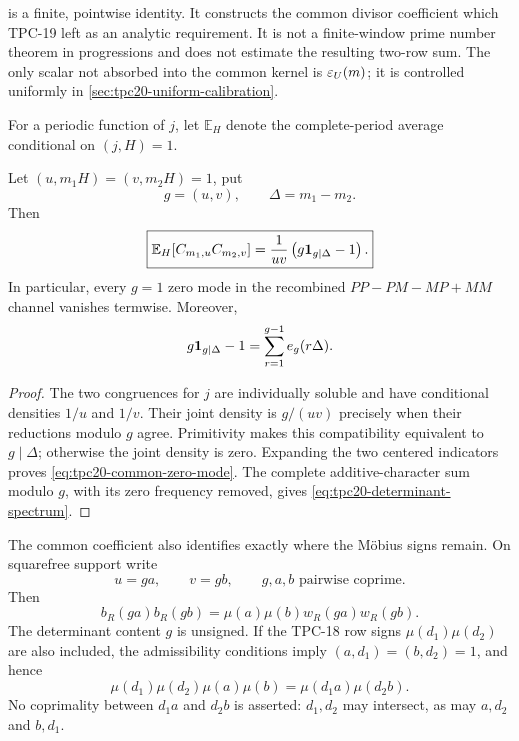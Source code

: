 \begin{remark}
\label{rem:tpc20-recombination-scope}
 is a finite, pointwise identity.
It constructs the common divisor coefficient which TPC-19 left as an
analytic requirement.  It is not a finite-window prime number theorem
in progressions and does not estimate the resulting two-row sum.  The
only scalar not absorbed into the common kernel is
\(\varepsilon_U(m)\); it is controlled uniformly in
\cref{sec:tpc20-uniform-calibration}.
\end{remark}

For a periodic function of \(j\), let \(\mathbb E_H\) denote the
complete-period average conditional on \((j,H)=1\).

\begin{proposition}
\label{prop:tpc20-common-zero-mode}
Let \((u,m_1H)=(v,m_2H)=1\), put
\[
 g=(u,v),\qquad \Delta=m_1-m_2.
\]
Then
\begin{equation}
 \boxed{
 \mathbb E_H\!
 \left[C_{m_1,u}C_{m_2,v}\right]
 =\frac1{uv}\left(g\mathbf 1_{g\mid\Delta}-1\right).}
 \label{eq:tpc20-common-zero-mode}
\end{equation}
In particular, every \(g=1\) zero mode in the recombined
\(PP-PM-MP+MM\) channel vanishes termwise.  Moreover,
\begin{equation}
 g\mathbf 1_{g\mid\Delta}-1
 =\sum_{r=1}^{g-1}e_g(r\Delta).
 \label{eq:tpc20-determinant-spectrum}
\end{equation}
\end{proposition}

\begin{proof}
The two congruences for \(j\) are individually soluble and have
conditional densities \(1/u\) and \(1/v\).  Their joint density is
\(g/(uv)\) precisely when their reductions modulo \(g\) agree.
Primitivity makes this compatibility equivalent to \(g\mid\Delta\);
otherwise the joint density is zero.  Expanding the two centered
indicators proves \eqref{eq:tpc20-common-zero-mode}.  The complete
additive-character sum modulo \(g\), with its zero frequency removed,
gives \eqref{eq:tpc20-determinant-spectrum}.
\end{proof}

The common coefficient also identifies exactly where the M\"obius signs
remain.  On squarefree support write
\begin{equation}
 u=ga,\qquad v=gb,
 \qquad g,a,b\text{ pairwise coprime}.
 \label{eq:tpc20-squarefree-gab}
\end{equation}
Then
\begin{equation}
 b_R(ga)b_R(gb)
 =\mu(a)\mu(b)w_R(ga)w_R(gb).
 \label{eq:tpc20-common-sign-cancellation}
\end{equation}
The determinant content \(g\) is unsigned.  If the TPC-18 row signs
\(\mu(d_1)\mu(d_2)\) are also included, the admissibility conditions
imply \((a,d_1)=(b,d_2)=1\), and hence
\begin{equation}
 \mu(d_1)\mu(d_2)\mu(a)\mu(b)
 =\mu(d_1a)\mu(d_2b).
 \label{eq:tpc20-row-frequency-sign-fusion}
\end{equation}
No coprimality between \(d_1a\) and \(d_2b\) is asserted: \(d_1,d_2\)
may intersect, as may \(a,d_2\) and \(b,d_1\).
